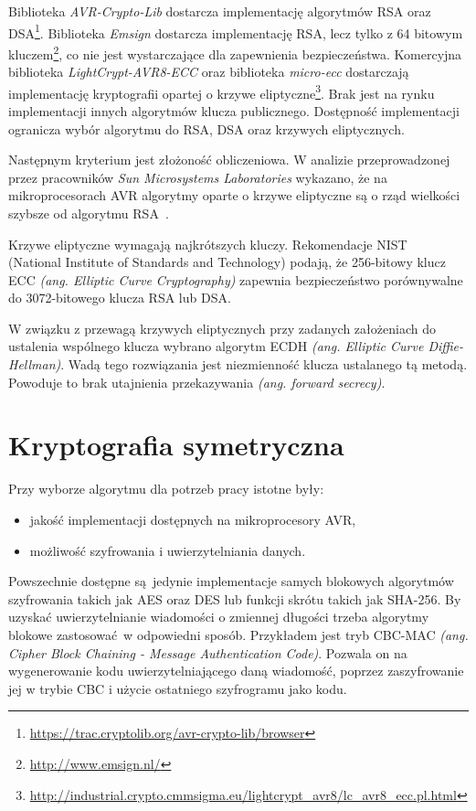 Biblioteka \emph{AVR-Crypto-Lib} dostarcza implementację algorytmów RSA oraz DSA\footnote{\url{https://trac.cryptolib.org/avr-crypto-lib/browser}}. Biblioteka \emph{Emsign} dostarcza implementację RSA, lecz tylko z 64 bitowym kluczem\footnote{\url{http://www.emsign.nl/}}, co nie jest wystarczające dla zapewnienia bezpieczeństwa. Komercyjna biblioteka \emph{LightCrypt-AVR8-ECC} oraz biblioteka \emph{micro-ecc} dostarczają implementację kryptografii opartej o krzywe eliptyczne\footnote{\url{http://industrial.crypto.cmmsigma.eu/lightcrypt_avr8/lc_avr8_ecc.pl.html}}. Brak jest na rynku implementacji innych algorytmów klucza publicznego. Dostępność implementacji ogranicza wybór algorytmu do RSA, DSA oraz krzywych eliptycznych.

Następnym kryterium jest złożoność obliczeniowa. W analizie przeprowadzonej przez pracowników \emph{Sun Microsystems Laboratories} wykazano, że na mikroprocesorach AVR algorytmy oparte o krzywe eliptyczne są o rząd wielkości szybsze od algorytmu RSA~\cite{Gura2004}.

Krzywe eliptyczne wymagają najkrótszych kluczy. Rekomendacje NIST~\cite{Nist} (National Institute of Standards and Technology) podają, że 256-bitowy klucz ECC \emph{(ang. Elliptic Curve Cryptography)} zapewnia bezpieczeństwo porównywalne do 3072-bitowego klucza RSA lub DSA.

W związku z przewagą krzywych eliptycznych przy zadanych założeniach do ustalenia wspólnego klucza wybrano algorytm ECDH \emph{(ang. Elliptic Curve Diffie-Hellman)}. Wadą tego rozwiązania jest niezmienność klucza ustalanego tą metodą. Powoduje to brak utajnienia przekazywania \emph{(ang. forward secrecy)}.

\section{Kryptografia symetryczna}
\label{sec:kryptoSym}

Przy wyborze algorytmu dla potrzeb pracy istotne były:

\begin{itemize}
\item jakość implementacji dostępnych na mikroprocesory AVR,
\item możliwość szyfrowania i uwierzytelniania danych.
\end{itemize}

Powszechnie dostępne są jedynie implementacje samych blokowych algorytmów szyfrowania takich jak AES oraz DES lub funkcji skrótu takich jak SHA-256. By uzyskać uwierzytelnianie wiadomości o zmiennej długości trzeba algorytmy blokowe zastosować w odpowiedni sposób. Przykładem jest tryb CBC-MAC {\itshape (ang. Cipher Block Chaining - Message Authentication Code)}. Pozwala on na wygenerowanie kodu uwierzytelniającego daną wiadomość, poprzez zaszyfrowanie jej w trybie CBC i użycie ostatniego szyfrogramu jako kodu.

